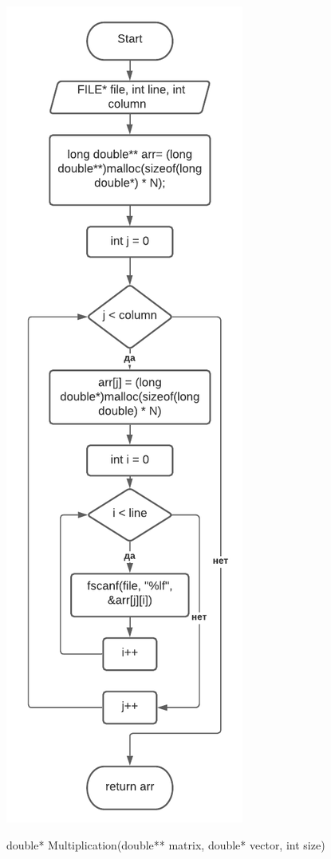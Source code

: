 \includegraphics[scale=0.7]{block1.pdf}

double* Multiplication(double** matrix, double* vector, int size)

